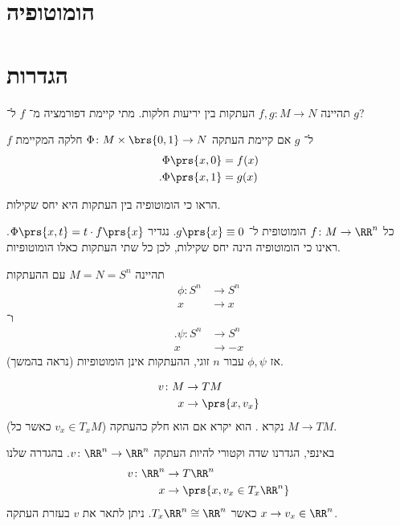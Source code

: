 \documentclass[a4paper,10pt,twoside,openany]{book}
\begin{document}
\section{הומוטופיה}
\section{הגדרות}
\begin{question}
תהיינה
$f,g\colon M \to N$
העתקות בין יריעות חלקות. מתי קיימת דפורמציה מ־%
$f$
ל־%
$g$?
\end{question}
\begin{definition}
$f$
ל־%
$g$
אם קיימת העתקה
$\Phi \colon M \times \brs{0,1} \to N$
חלקה המקיימת
\begin{align*}
\Phi\prs{x,0} &= f(x) \\
\text{.}\Phi\prs{x,1} &= g(x)
\end{align*}
\end{definition}
\begin{exercise}
הראו כי הומוטופיה בין העתקות היא יחס שקילות.
\end{exercise}
\begin{example}
כל
$f \colon M \to \RR^n$
הומוטופית ל־%
$g\prs{x} \equiv 0$.
נגדיר
$\Phi\prs{x,t} = t\cdot f\prs{x}$.
ראינו כי הומוטופיה הינה יחס שקילות, לכן כל שתי העתקות כאלו הומוטופיות.
\end{example}
\begin{example}
\label{homotopy: maps on sphere}
תהיינה
$M = N = S^n$
עם ההעתקות
\begin{align*}
\phi \colon S^n &\to S^n \\ x &\to x
\end{align*}
ו־%
\begin{align*}
\text{.}\psi \colon S^n &\to S^n \\ x &\to -x
\end{align*}
אז
$\phi,\psi$
עבור
$n$
זוגי,
ההעתקות אינן
הומוטופיות (נראה בהמשך).
\end{example}
\begin{definition}
\begin{align*}
v \colon M &\to TM \\ x &\to \prs{x,v_x}
\end{align*}
(כאשר כל
$v_x \in T_x M$)
נקרא
.
הוא יקרא
אם הוא חלק כהעתקה
$M \to TM$.
\end{definition}
\begin{example}
באינפי, הגדרנו שדה וקטורי להיות העתקה
$v \colon \RR^n \to \RR^n$.
בהגדרה שלנו
\begin{align*}
v \colon \RR^n &\to T\RR^n \\ x &\to \prs{x, v_x \in T_x\RR^n}
\end{align*}
כאשר
$T_x \RR^n \cong \RR^n$.
ניתן לתאר את
$v$
בעזרת העתקה
$x \to v_x \in \RR^n$.
\end{example}
\end{document}
